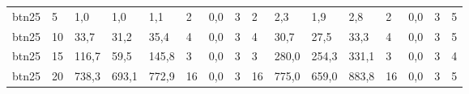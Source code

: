 \begin{table}[]
\begin{tabular}{llllllllllllllll}
		btn25   & 5      & 1,0                                                 & 1,0                                                 & 1,1                                                 & 2                                                   & 0,0                                                 & 3      & 2                                                         & 2,3                                                 & 1,9                                                 & 2,8                                                 & 2                                                   & 0,0                                                 & 3      & 5                                                         \\
		btn25   & 10     & 33,7                                                & 31,2                                                & 35,4                                                & 4                                                   & 0,0                                                 & 3      & 4                                                         & 30,7                                                & 27,5                                                & 33,3                                                & 4                                                   & 0,0                                                 & 3      & 5                                                         \\
		btn25   & 15     & 116,7                                               & 59,5                                                & 145,8                                               & 3                                                   & 0,0                                                 & 3      & 3                                                         & 280,0                                               & 254,3                                               & 331,1                                               & 3                                                   & 0,0                                                 & 3      & 4                                                         \\
		btn25   & 20     & 738,3                                               & 693,1                                               & 772,9                                               & 16                                                  & 0,0                                                 & 3      & 16                                                        & 775,0                                               & 659,0                                               & 883,8                                               & 16                                                  & 0,0                                                 & 3      & 5                                                         \\

\end{tabular}
\end{table}
